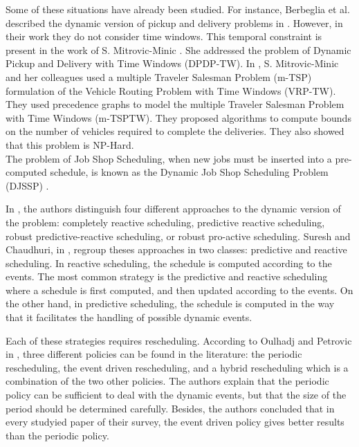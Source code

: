 \documentclass[review]{elsarticle}
\begin{document}
Some of these situations have already been studied. For instance, Berbeglia et al. described the dynamic version of pickup and delivery problems in \cite{Berbeglia2010}. However, in their work they do not consider time windows. This temporal constraint is present in the work of S. Mitrovic-Minic \cite{Mitrovic2001}. She addressed the problem of Dynamic Pickup and Delivery with Time Windows (DPDP-TW). In \cite{Mitrovic2006}, S. Mitrovic-Minic and her colleagues used a multiple Traveler Salesman Problem (m-TSP) formulation of the Vehicle Routing Problem with Time Windows (VRP-TW). They used precedence graphs to model the multiple Traveler Salesman Problem with Time Windows (m-TSPTW). They proposed algorithms to compute bounds on the number of vehicles required to complete the deliveries. They also showed that this problem is NP-Hard.\\

The problem of Job Shop Scheduling, when new jobs must be inserted into a pre-computed schedule, is known as the Dynamic Job Shop Scheduling Problem (DJSSP) \cite{Ramasesh1990}.

In \cite{Ouelhadj2009}, the authors distinguish four different approaches to the dynamic version of the problem: completely reactive scheduling, predictive reactive scheduling, robust predictive-reactive scheduling, or robust pro-active scheduling. Suresh and Chaudhuri, in \cite{Suresh1993}, regroup theses approaches in two classes: predictive and reactive scheduling. In reactive scheduling, the schedule is computed according to the events. The most common strategy is the predictive and reactive scheduling where a schedule is first computed, and then updated according to the events. On the other hand, in predictive scheduling, the schedule is computed in the way that it facilitates the handling of possible dynamic events.

Each of these strategies requires rescheduling. According to Oulhadj and Petrovic in \cite{Ouelhadj2009}, three different policies can be found in the literature: the periodic rescheduling, the event driven rescheduling, and a hybrid rescheduling which is a combination of the two other policies. The authors explain that the periodic policy can be sufficient to deal with the dynamic events, but that the size of the period should be determined carefully. Besides, the authors concluded that in every studyied paper of their survey, the event driven policy gives better results than the periodic policy.
\end{document}
